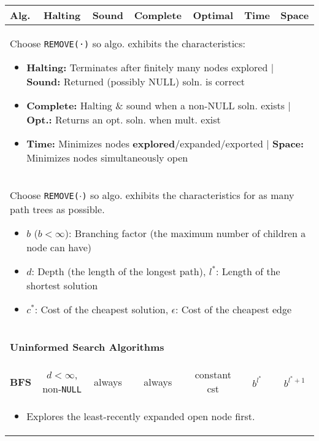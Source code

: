 \begin{summary}
    \begin{center}
        \begin{tabular}{lcccccc}
        \toprule
        \textbf{Alg.} & Halting & Sound & Complete & Optimal & Time & Space \\
        \midrule
        \multicolumn{7}{p{\linewidth}}{
            Choose \texttt{REMOVE(·)} so algo. exhibits the characteristics:
            \begin{itemize}
                \item \textbf{Halting:} Terminates after finitely many nodes explored $\mid$ \textbf{Sound:} Returned (possibly NULL) soln. is correct 
                \item \textbf{Complete:} Halting \& sound when a non-NULL soln. exists $\mid$ \textbf{Opt.:} Returns an opt. soln. when mult. exist 
                \item \textbf{Time:} Minimizes nodes \textbf{explored}/expanded/exported $\mid$ \textbf{Space:} Minimizes nodes simultaneously open
            \end{itemize}} \\
        \midrule
        \multicolumn{7}{p{\linewidth}}{
            Choose \texttt{REMOVE($\cdot$)} so algo. exhibits the characteristics for as many path trees as possible. 
            \begin{itemize}
                \item $b$ ($b < \infty$): Branching factor (the maximum number of children a node can have)
                \item $d$: Depth (the length of the longest path), $l^*$: Length of the shortest solution
                \item $c^*$: Cost of the cheapest solution, $\epsilon$: Cost of the cheapest edge
            \end{itemize}
        } \\
        \midrule
        \multicolumn{7}{p{\linewidth}}{
        \begin{center}
            \textbf{Uninformed Search Algorithms}
        \end{center}} \\
        \midrule
        \textbf{BFS} & $d<\infty$, non-\texttt{NULL} & always & always & constant cst & $b^{l^{*}}$ & $b^{l^{*} + 1}$ \\
        \multicolumn{7}{p{\linewidth}}{
        \begin{itemize}
            \item Explores the least-recently expanded open node first.

\end{itemize}}
\end{tabular}
\end{center}
\end{summary}
